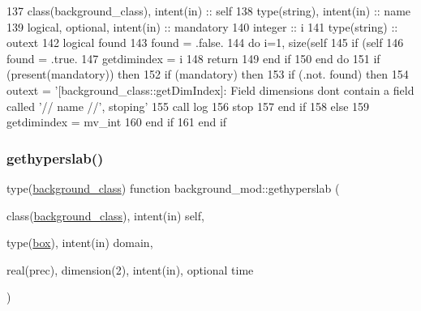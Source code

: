 \begin{DoxyCode}
137     \textcolor{keywordtype}{class}(background\_class), \textcolor{keywordtype}{intent(in)} :: self
138     \textcolor{keywordtype}{type}(string), \textcolor{keywordtype}{intent(in)} :: name
139     \textcolor{keywordtype}{logical}, \textcolor{keywordtype}{optional}, \textcolor{keywordtype}{intent(in)} :: mandatory
140     \textcolor{keywordtype}{integer} :: i
141     \textcolor{keywordtype}{type}(string) :: outext
142     \textcolor{keywordtype}{logical} found
143     found = .false.
144     \textcolor{keywordflow}{do} i=1, \textcolor{keyword}{size}(self%
145         \textcolor{keywordflow}{if} (self%
146             found = .true.
147             getdimindex = i
148             \textcolor{keywordflow}{return}
149 \textcolor{keywordflow}{        end if}
150 \textcolor{keywordflow}{    end do}
151     \textcolor{keywordflow}{if} (\textcolor{keyword}{present}(mandatory)) \textcolor{keywordflow}{then}
152         \textcolor{keywordflow}{if} (mandatory) \textcolor{keywordflow}{then}
153             \textcolor{keywordflow}{if} (.not. found) \textcolor{keywordflow}{then}
154                 outext = \textcolor{stringliteral}{'[background\_class::getDimIndex]: Field dimensions dont contain a field called '}//
       name //\textcolor{stringliteral}{', stoping'}
155                 \textcolor{keyword}{call }log%
156                 stop
157 \textcolor{keywordflow}{            end if}
158         \textcolor{keywordflow}{else}
159             getdimindex = mv\_int
160 \textcolor{keywordflow}{        end if}
161 \textcolor{keywordflow}{    end if}
\end{DoxyCode}
\mbox{\label{namespacebackground__mod_ae26fda3baab915148ec5749d1eda2ea6}} 
\subsubsection{\texorpdfstring{gethyperslab()}{gethyperslab()}}
{\footnotesize\ttfamily type(\mbox{\hyperlink{structbackground__mod_1_1background__class}{background\+\_\+class}}) function background\+\_\+mod\+::gethyperslab (\begin{DoxyParamCaption}\item[{class(\mbox{\hyperlink{structbackground__mod_1_1background__class}{background\+\_\+class}}), intent(in)}]{self,  }\item[{type(\mbox{\hyperlink{structgeometry__mod_1_1box}{box}}), intent(in)}]{domain,  }\item[{real(prec), dimension(2), intent(in), optional}]{time }\end{DoxyParamCaption})\hspace{0.3cm}{\ttfamily [private]}}



